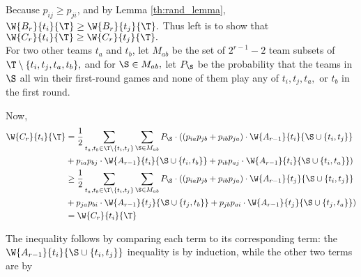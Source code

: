 {{        Because $p_{ij} \geq p_{ji}$, and by Lemma \ref{th:rand_lemma}, $\W{B_r}{t_i}{\T} \geq \W{B_r}{t_j}{\T}.$ Thus left is to show that $\W{C_r}{t_i}{\T} \geq \W{C_r}{t_j}{\T}.$\\
        
        For two other teams $t_a$ and $t_b$, let $M_{ab}$ be the set of $2^{r-1}-2$ team subsets of $\T \setminus \{t_i, t_j, t_a, t_b\},$ and for $\S \in M_{ab},$ let $P_\S$ be the probability that the teams in $\S$ all win their first-round games and none of them play any of $t_i, t_j, t_a,$ or $t_b$ in the first round.

        Now,
        \begin{align*}
            \W{C_r}{t_i}{\T} &= \frac{1}{2}\sum_{t_a, t_b \in \T \setminus \{t_i, t_j\}} \sum_{\S \in M_{ab}} P_\S \cdot ((p_{ia}p_{jb} + p_{ib}p_{ja}) \cdot \W{A_{r-1}}{t_i}{\S \cup \{t_i, t_j\}}\\
            &+p_{ia}p_{bj} \cdot \W{A_{r-1}}{t_i}{\S \cup \{t_i, t_b\}}+p_{ib}p_{aj} \cdot \W{A_{r-1}}{t_i}{\S \cup \{t_i, t_a\}})\\
            &\geq \frac{1}{2}\sum_{t_a, t_b \in \T \setminus \{t_i, t_j\}} \sum_{\S \in M_{ab}} P_\S \cdot ((p_{ia}p_{jb} + p_{ib}p_{ja}) \cdot \W{A_{r-1}}{t_j}{\S \cup \{t_i, t_j\}}\\
            &+p_{ja}p_{bi} \cdot \W{A_{r-1}}{t_j}{\S \cup \{t_j, t_b\}}+p_{jb}p_{ai} \cdot \W{A_{r-1}}{t_j}{\S \cup \{t_j, t_a\}})\\
            &=\W{C_r}{t_i}{\T}
        \end{align*}

        The inequality follows by comparing each term to its corresponding term: the $\W{A_{r-1}}{t_i}{\S \cup \{t_i, t_j\}}$ inequality is by induction, while the other two terms are by 
    }{}











}






    
